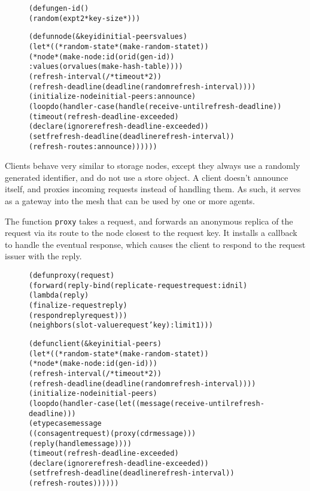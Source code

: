 \documentclass [a4paper,12pt,oneside]{article}\usepackage [paper=a4paper,left=37.5264mm,right=37.5264mm,top=37.5264mm,bottom=37.5264mm]{geometry}\usepackage {graphicx}\usepackage {tabularx}\usepackage {alltt}\usepackage {float}\usepackage [section]{placeins}\usepackage {titling}\setlength {\droptitle }{-4em}\pretitle {\begin {flushright}\bfseries \LARGE }\posttitle {\end {flushright}}\preauthor {\begin {flushright}}\postauthor {\end {flushright}}\predate {\begin {flushright}}\postdate {\end {flushright}}\usepackage [english]{babel}\usepackage [T1]{fontenc}\usepackage [utf8x]{inputenc}\usepackage {stmaryrd}\usepackage {amsfonts}\DeclareUnicodeCharacter {12314}{$\llbracket $}\DeclareUnicodeCharacter {12315}{$\rrbracket $}\DeclareUnicodeCharacter {9655}{$\rhd $}\newcommand \nobreakdash {\mbox {-}}\DeclareUnicodeCharacter {8209}{\nobreakdash }\usepackage [sc]{mathpazo}\linespread {1.05}\usepackage [font={small},labelformat=empty,labelsep=none]{caption}\tolerance=10000 \clubpenalty=10000 \widowpenalty=10000 \frenchspacing
\begin{document}
\begin {figure}[H]\centering \begin {alltt}
(defun gen-id ()
  (random (expt 2 *key-size*)))

(defun node (\&key id initial-peers values)
  (let* ((*random-state* (make-random-state t))
         (*node* (make-node :id (or id (gen-id))
                            :values (or values (make-hash-table))))
         (refresh-interval (/ *timeout* 2))
         (refresh-deadline (deadline (random refresh-interval))))
    (initialize-node initial-peers :announce)
    (loop do (handler-case (handle (receive-until refresh-deadline))
               (timeout (refresh-deadline-exceeded)
                 (declare (ignore refresh-deadline-exceeded))
                 (setf refresh-deadline (deadline refresh-interval))
                 (refresh-routes :announce))))))
\end{alltt}\vspace {-1em}\end {figure}

Clients behave very similar to storage nodes, except they always use a randomly generated identifier, and do not use a store object. A client doesn’t announce itself, and proxies incoming requests instead of handling them. As such, it serves as a gateway into the mesh that can be used by one or more agents.

The function \texttt {proxy} takes a request, and forwards an anonymous replica of the request via its route to the node closest to the request key. It installs a callback to handle the eventual response, which causes the client to respond to the request issuer with the reply.

\begin {figure}[H]\centering \begin {alltt}
(defun proxy (request)
  (forward (reply-bind (replicate-request request :id nil)
                       (lambda (reply)
                         (finalize-request reply)
                         (respond reply request)))
           (neighbors (slot-value request 'key) :limit 1)))

(defun client (\&key initial-peers)
  (let* ((*random-state* (make-random-state t))
         (*node* (make-node :id (gen-id)))
         (refresh-interval (/ *timeout* 2))
         (refresh-deadline (deadline (random refresh-interval))))
    (initialize-node initial-peers)
    (loop do (handler-case (let ((message (receive-until refresh-deadline)))
                             (etypecase message
                               ((cons agent request) (proxy (cdr message)))
                               (reply (handle message))))
               (timeout (refresh-deadline-exceeded)
                 (declare (ignore refresh-deadline-exceeded))
                 (setf refresh-deadline (deadline refresh-interval))
                 (refresh-routes))))))
\end{alltt}\vspace {-1em}\end {figure}
\end{document}
